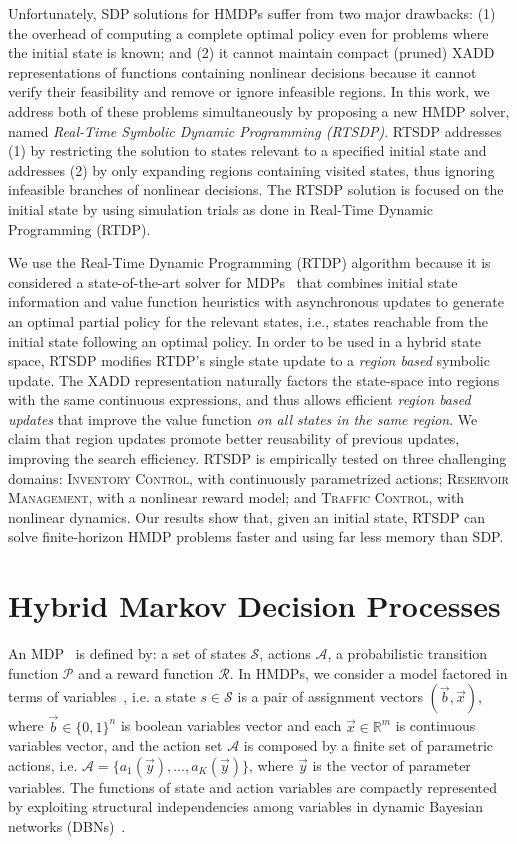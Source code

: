 \documentclass[letterpaper]{article}
\newcommand{\Invent}{\textsc{Inventory Control}}
\newcommand{\Traffic}{\textsc{Traffic Control}}
\newcommand{\Reservoir}{\textsc{Reservoir Management}}
\begin{document}
Unfortunately, SDP solutions for HMDPs suffer from two major drawbacks: (1) the overhead of computing a complete optimal policy even for problems where the initial state is known; and (2) it cannot maintain compact (pruned) XADD representations of functions containing nonlinear decisions because it cannot verify their feasibility and remove or ignore infeasible regions.
In this work, we address both of these problems simultaneously by proposing a new HMDP solver, named \emph{Real-Time Symbolic Dynamic Programming (RTSDP)}.
RTSDP addresses (1) by restricting the solution to states relevant to a specified initial state and addresses (2) by only expanding regions containing visited states, thus ignoring infeasible branches of nonlinear decisions. The RTSDP solution is focused on the initial state by using simulation trials as done in Real-Time Dynamic Programming (RTDP).

We use the Real-Time Dynamic Programming (RTDP) algorithm because it is considered a state-of-the-art solver for MDPs~\cite{Barto95RTDP,kolobov12GOURMAND} that combines initial state information and value function heuristics with asynchronous updates to generate an optimal partial policy for the relevant states, i.e., states reachable from the initial state following an optimal policy.
In order to be used in a hybrid state space, RTSDP modifies RTDP's single state update to a \emph{region based} symbolic update. The XADD representation naturally factors the state-space into regions with the same continuous expressions, and thus allows efficient \emph{region based updates} that improve the value function  \emph{on all states in the same region}. We claim that region updates promote better reusability of previous updates, improving the search efficiency. 
RTSDP is empirically tested on three challenging domains: \Invent, with continuously parametrized actions; \Reservoir, with a nonlinear reward model; and \Traffic, with nonlinear dynamics.
Our results show that, given an initial state, RTSDP can solve finite-horizon HMDP problems faster and using far less memory than SDP.

\section{Hybrid Markov Decision Processes}

An MDP~\cite{puterman94} is defined by: a set of states $\mathcal{S}$, actions $\mathcal{A}$, a probabilistic transition function $\mathcal{P}$ and a reward function $\mathcal{R}$.
In HMDPs, we consider a model factored in terms of variables~\cite{boutilier99}, i.e.
a state $s \in \mathcal{S}$ is a pair of assignment vectors $(\vec{b},\vec{x})$, where $\vec{b} \in \{ 0,1 \}^n$ is boolean variables vector and each $\vec{x} \in \mathbb{R}^m$ is continuous variables vector, and the action set $\mathcal{A}$ is composed by a finite set of parametric actions, i.e. $\mathcal{A} = \{ a_1(\vec{y}), \ldots, a_K(\vec{y})\}$, where $\vec{y}$ is the vector of parameter variables.
The functions of state and action variables are compactly represented by exploiting structural independencies among variables in dynamic Bayesian networks (DBNs)~\cite{dean90DBN}. 
\end{document}
